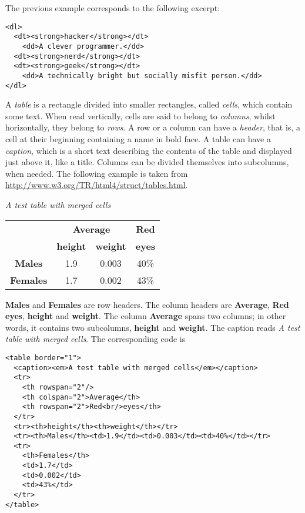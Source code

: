 The previous example corresponds to the following \HTML excerpt:
\begin{verbatim}
<dl>
  <dt><strong>hacker</strong></dt>
    <dd>A clever programmer.</dd>
  <dt><strong>nerd</strong></dt>
  <dt><strong>geek</strong></dt>
    <dd>A technically bright but socially misfit person.</dd>
</dl>
\end{verbatim}
A \emph{table} is a rectangle divided into smaller rectangles, called
\emph{cells}, which contain some text. When read vertically, cells are
said to belong to \emph{columns}, whilst horizontally, they belong to
\emph{rows}. A row or a column can have a \emph{header}, that is, a
cell at their beginning containing a name in bold face. A table can
have a \emph{caption}, which is a short text describing the contents
of the table and displayed just above it, like a title. Columns can be
divided themselves into subcolumns, when needed. The following example
is taken from \url{http://www.w3.org/TR/html4/struct/tables.html}.
\begin{center}
\emph{A test table with merged cells}\\

\begin{tabular}{|c|c|c|c|}
\hline
                 & \multicolumn{2}{|c|}{\textbf{Average}} & \textbf{Red}\\
\cline{2-3}
                 & \textbf{height}    &   \textbf{weight} & \textbf{eyes}\\
\hline
\textbf{Males}   & 1.9                & 0.003             & 40\%\\
\hline
\textbf{Females} & 1.7                & 0.002             & 43\%\\
\hline
\end{tabular}
\end{center}
\textbf{Males} and \textbf{Females} are row headers. The column
headers are \textbf{Average}, \textbf{Red eyes}, \textbf{height} and
\textbf{weight}. The column \textbf{Average} spans two columns; in
other words, it contains two subcolumns, \textbf{height} and
\textbf{weight}. The caption reads \emph{A test table with merged
  cells}. The corresponding \HTML code is
\begin{verbatim}
<table border="1">
  <caption><em>A test table with merged cells</em></caption>
  <tr>
    <th rowspan="2"/>
    <th colspan="2">Average</th>
    <th rowspan="2">Red<br/>eyes</th>
  </tr>
  <tr><th>height</th><th>weight</th></tr>
  <tr><th>Males</th><td>1.9</td><td>0.003</td><td>40%</td></tr>
  <tr>
    <th>Females</th>
    <td>1.7</td>
    <td>0.002</td>
    <td>43%</td>
  </tr>
</table>
\end{verbatim}
